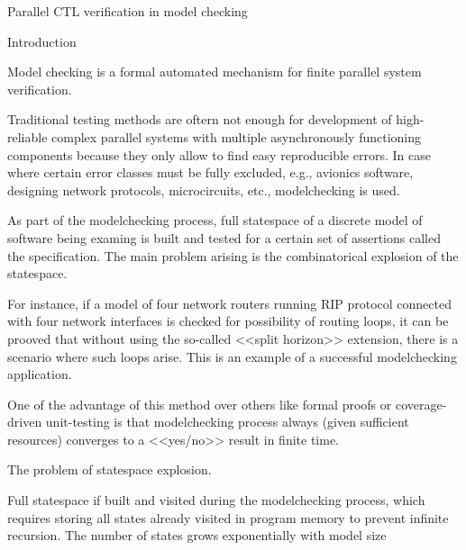 Parallel CTL verification in model checking

Introduction

Model checking is a formal automated mechanism for finite parallel system verification.

Traditional testing methods are oftern not enough for development of high-reliable complex
parallel systems with multiple asynchronously functioning components because they only
allow to find easy reproducible errors. In case where certain error classes must be fully
excluded, e.g., avionics software, designing network protocols, microcircuits, etc.,
modelchecking is used.

As part of the modelchecking process, full statespace of a discrete model of software
being examing is built and tested for a certain set of assertions called the
specification. The main problem arising is the combinatorical explosion of the statespace.

For instance, if a model of four network routers running RIP protocol connected with four
network interfaces is checked for possibility of routing loops, it can be prooved that
without using the so-called <<split horizon>> extension, there is a scenario where such
loops arise. This is an example of a successful modelchecking application.

One of the advantage of this method over others like formal proofs or coverage-driven
unit-testing is that modelchecking process always (given sufficient resources) converges
to a <<yes/no>> result in finite time.

The problem of statespace explosion.

Full statespace if built and visited during the modelchecking process, which requires
storing all states already visited in program memory to prevent infinite recursion. The
number of states grows exponentially with model size


